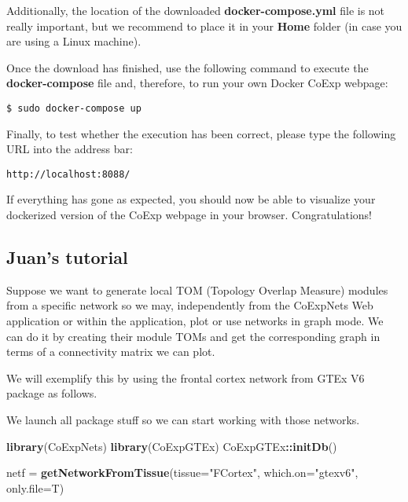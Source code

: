 \documentclass[]{book}
\newenvironment{Shaded}{\begin{snugshade}}{\end{snugshade}}
\newcommand{\KeywordTok}[1]{\textcolor[rgb]{0.13,0.29,0.53}{\textbf{#1}}}
\newcommand{\DataTypeTok}[1]{\textcolor[rgb]{0.13,0.29,0.53}{#1}}
\newcommand{\StringTok}[1]{\textcolor[rgb]{0.31,0.60,0.02}{#1}}
\newcommand{\OperatorTok}[1]{\textcolor[rgb]{0.81,0.36,0.00}{\textbf{#1}}}
\newcommand{\NormalTok}[1]{#1}
\begin{document}
Additionally, the location of the downloaded \textbf{docker-compose.yml}
file is not really important, but we recommend to place it in your
\textbf{Home} folder (in case you are using a Linux machine).

Once the download has finished, use the following command to execute the
\textbf{docker-compose} file and, therefore, to run your own Docker
CoExp webpage:

\begin{verbatim}
$ sudo docker-compose up
\end{verbatim}

Finally, to test whether the execution has been correct, please type the
following URL into the address bar:

\begin{verbatim}
http://localhost:8088/
\end{verbatim}

If everything has gone as expected, you should now be able to visualize
your dockerized version of the CoExp webpage in your browser.
Congratulations!

\subsection{Juan's tutorial}\label{juans-tutorial}

Suppose we want to generate local TOM (Topology Overlap Measure) modules
from a specific network so we may, independently from the CoExpNets Web
application or within the application, plot or use networks in graph
mode. We can do it by creating their module TOMs and get the
corresponding graph in terms of a connectivity matrix we can plot.

We will exemplify this by using the frontal cortex network from GTEx V6
package as follows.

We launch all package stuff so we can start working with those networks.

\begin{Shaded}
\begin{Highlighting}[]
\KeywordTok{library}\NormalTok{(CoExpNets)}
\KeywordTok{library}\NormalTok{(CoExpGTEx)}
\NormalTok{CoExpGTEx}\OperatorTok{::}\KeywordTok{initDb}\NormalTok{()}

\NormalTok{netf =}\StringTok{ }\KeywordTok{getNetworkFromTissue}\NormalTok{(}\DataTypeTok{tissue=}\StringTok{"FCortex"}\NormalTok{,}
                            \DataTypeTok{which.on=}\StringTok{"gtexv6"}\NormalTok{,}
                            \DataTypeTok{only.file=}\NormalTok{T)}
\end{Highlighting}
\end{Shaded}
\end{document}
